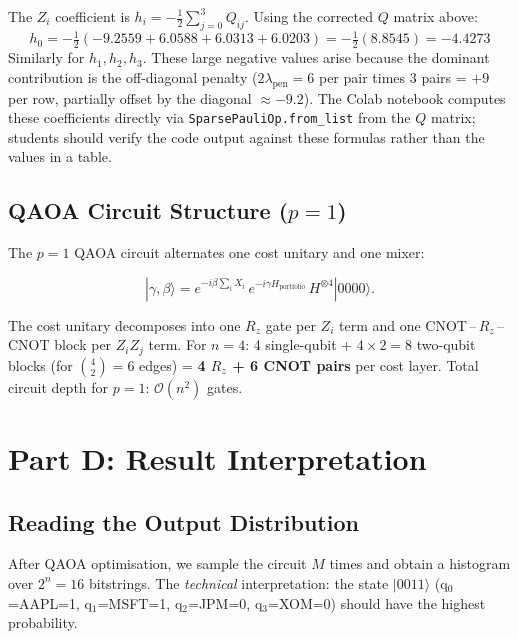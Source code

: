 \documentclass[a4paper,11pt]{article}
\newcommand{\ket}[1]{|#1\rangle}
\begin{document}
\begin{warningbox}
The $Z_i$ coefficient is $h_i = -\tfrac{1}{2}\sum_{j=0}^{3} Q_{ij}$.
Using the corrected $Q$ matrix above:
\[
h_0 = -\tfrac{1}{2}(-9.2559 + 6.0588 + 6.0313 + 6.0203) = -\tfrac{1}{2}(8.8545) = -4.4273
\]
Similarly for $h_1,h_2,h_3$.  These large negative values arise because the dominant
contribution is the off-diagonal penalty ($2\lambda_\text{pen} = 6$ per pair times 3
pairs = $+9$ per row, partially offset by the diagonal $\approx -9.2$).
The Colab notebook computes these coefficients directly via
\texttt{SparsePauliOp.from\_list} from the $Q$ matrix; students should verify
the code output against these formulas rather than the values in a table.
\end{warningbox}

\subsection{QAOA Circuit Structure ($p=1$)}

The $p=1$ QAOA circuit alternates one cost unitary and one mixer:

\begin{equation}
    \ket{\gamma,\beta} =
    e^{-i\beta\sum_i X_i}\,
    e^{-i\gamma H_\text{portfolio}}\,
    H^{\otimes 4}\ket{0000}.
\end{equation}

The cost unitary decomposes into one $R_z$ gate per $Z_i$ term and
one CNOT\,--\,$R_z$\,--\,CNOT block per $Z_iZ_j$ term. For $n=4$:
4 single-qubit + $4 \times 2 = 8$ two-qubit blocks (for $\binom{4}{2}=6$ edges)
= \textbf{4 $R_z$ + 6 CNOT pairs} per cost layer. Total circuit depth
for $p=1$: $\mathcal{O}(n^2)$ gates.

\section{Part D: Result Interpretation}

\subsection{Reading the Output Distribution}

After QAOA optimisation, we sample the circuit $M$ times and obtain a
histogram over $2^n = 16$ bitstrings. The \emph{technical} interpretation:
the state $\ket{0011}$ (q$_0$=AAPL=1, q$_1$=MSFT=1, q$_2$=JPM=0,
q$_3$=XOM=0) should have the highest probability.
\end{document}
